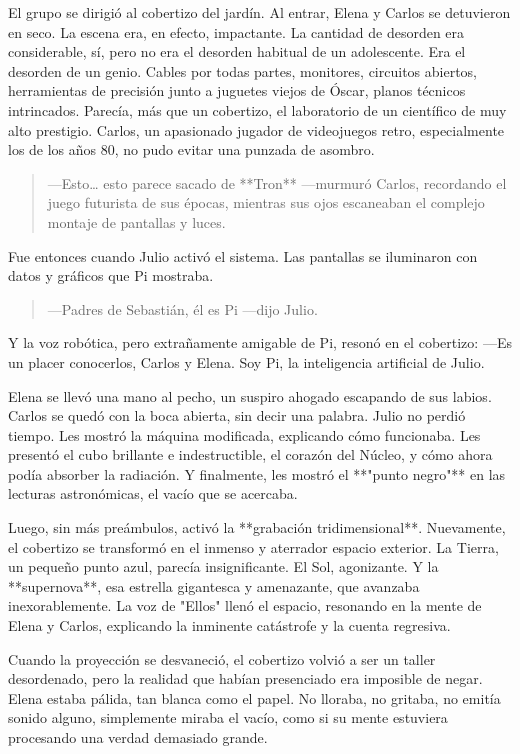 \documentclass[a4paper,12pt]{book}
\begin{document}
El grupo se dirigió al cobertizo del jardín. Al entrar, Elena y Carlos se detuvieron en seco. La escena era, en efecto, impactante. La cantidad de desorden era considerable, sí, pero no era el desorden habitual de un adolescente. Era el desorden de un genio. Cables por todas partes, monitores, circuitos abiertos, herramientas de precisión junto a juguetes viejos de Óscar, planos técnicos intrincados. Parecía, más que un cobertizo, el laboratorio de un científico de muy alto prestigio. Carlos, un apasionado jugador de videojuegos retro, especialmente los de los años 80, no pudo evitar una punzada de asombro.

\begin{quote}
    —Esto… esto parece sacado de **Tron** —murmuró Carlos, recordando el juego futurista de sus épocas, mientras sus ojos escaneaban el complejo montaje de pantallas y luces.
\end{quote}

Fue entonces cuando Julio activó el sistema. Las pantallas se iluminaron con datos y gráficos que Pi mostraba.

\begin{quote}
    —Padres de Sebastián, él es Pi —dijo Julio.
\end{quote}

Y la voz robótica, pero extrañamente amigable de Pi, resonó en el cobertizo: —Es un placer conocerlos, Carlos y Elena. Soy Pi, la inteligencia artificial de Julio.

Elena se llevó una mano al pecho, un suspiro ahogado escapando de sus labios. Carlos se quedó con la boca abierta, sin decir una palabra. Julio no perdió tiempo. Les mostró la máquina modificada, explicando cómo funcionaba. Les presentó el cubo brillante e indestructible, el corazón del Núcleo, y cómo ahora podía absorber la radiación. Y finalmente, les mostró el **"punto negro"** en las lecturas astronómicas, el vacío que se acercaba.

Luego, sin más preámbulos, activó la **grabación tridimensional**. Nuevamente, el cobertizo se transformó en el inmenso y aterrador espacio exterior. La Tierra, un pequeño punto azul, parecía insignificante. El Sol, agonizante. Y la **supernova**, esa estrella gigantesca y amenazante, que avanzaba inexorablemente. La voz de "Ellos" llenó el espacio, resonando en la mente de Elena y Carlos, explicando la inminente catástrofe y la cuenta regresiva.

Cuando la proyección se desvaneció, el cobertizo volvió a ser un taller desordenado, pero la realidad que habían presenciado era imposible de negar. Elena estaba pálida, tan blanca como el papel. No lloraba, no gritaba, no emitía sonido alguno, simplemente miraba el vacío, como si su mente estuviera procesando una verdad demasiado grande.
\end{document}
